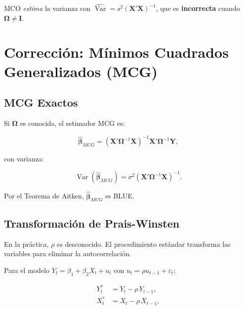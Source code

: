 \documentclass[12pt,a4paper]{article}
\theoremstyle{definition}
\theoremstyle{remark}
\begin{document}
MCO \emph{estima} la varianza con $\widehat{\operatorname{Var}} =
s^2(\mathbf{X}'\mathbf{X})^{-1}$, que es \textbf{incorrecta} cuando
$\boldsymbol{\Omega} \neq \mathbf{I}$.

\section{Corrección: Mínimos Cuadrados Generalizados (MCG)}
\label{sec:mcg}

\subsection{MCG Exactos}

Si $\boldsymbol{\Omega}$ es conocida, el estimador MCG es:

\begin{equation}
  \boldsymbol{\hat\beta}_{MCG}
    = (\mathbf{X}'\boldsymbol{\Omega}^{-1}\mathbf{X})^{-1}
      \mathbf{X}'\boldsymbol{\Omega}^{-1}\mathbf{Y},
  \label{eq:mcg}
\end{equation}

con varianza:

\begin{equation}
  \operatorname{Var}(\boldsymbol{\hat\beta}_{MCG})
    = \sigma^2 (\mathbf{X}'\boldsymbol{\Omega}^{-1}\mathbf{X})^{-1}.
  \label{eq:var-mcg}
\end{equation}

Por el Teorema de Aitken, $\boldsymbol{\hat\beta}_{MCG}$ es BLUE.

\subsection{Transformación de Prais-Winsten}

En la práctica, $\rho$ es desconocido. El procedimiento estándar
transforma las variables para eliminar la autocorrelación.

Para el modelo $Y_t = \beta_1 + \beta_2 X_t + u_t$ con $u_t = \rho
u_{t-1} + \varepsilon_t$:

\begin{align}
  Y_t^* &= Y_t - \rho\, Y_{t-1}, \label{eq:yt-star}\\
  X_t^* &= X_t - \rho\, X_{t-1}, \label{eq:xt-star}
\end{align}
\end{document}
